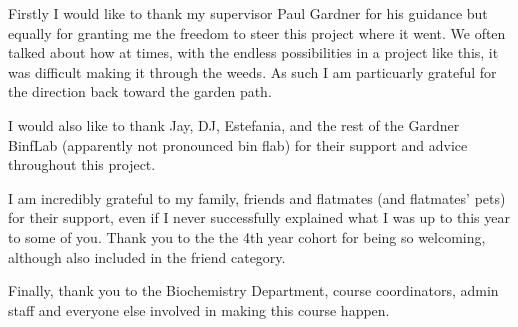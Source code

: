 Firstly I would like to thank my supervisor Paul Gardner for his guidance but equally for granting me the freedom to steer this project where it went.
We often talked about how at times, with the endless possibilities in a project like this, it was difficult making it through the weeds.
As such I am particuarly grateful for the direction back toward the garden path.

I would also like to thank Jay, DJ, Estefania, and the rest of the Gardner BinfLab (apparently not pronounced bin flab) for their support and advice throughout this project.

I am incredibly grateful to my family, friends and flatmates (and flatmates' pets) for their support, even if I never successfully explained what I was up to this year to some of you.
Thank you to the the 4th year cohort for being so welcoming, although also included in the friend category.

Finally, thank you to the Biochemistry Department, course coordinators, admin staff and everyone else involved in making this course happen.
